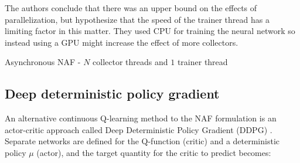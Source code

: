The authors conclude that there was an upper bound on the effects of
parallelization, but hypothesize that the speed of the trainer thread has a
limiting factor in this matter. They used CPU for training the neural network
so instead using a GPU might increase the effect of more collectors.

\begin{algorithm}[!h]
    \caption{Asynchronous NAF - $N$ collector threads and $1$ trainer thread}
    \begin{algorithmic}
        \ENDFOR
            \ENDFOR
        \ENDFOR
    \end{algorithmic}
    \label{algo:async_naf}
\end{algorithm}

\subsection{Deep deterministic policy gradient}
\label{sec:ddpg}

An alternative continuous Q-learning method to the NAF formulation is an
actor-critic approach called Deep Deterministic Policy Gradient (DDPG)
\cite{lillicrap2015continuous}. Separate networks are defined for the
Q-function (critic) and a deterministic policy $\mu$ (actor), and the
target quantity for the critic to predict becomes:

